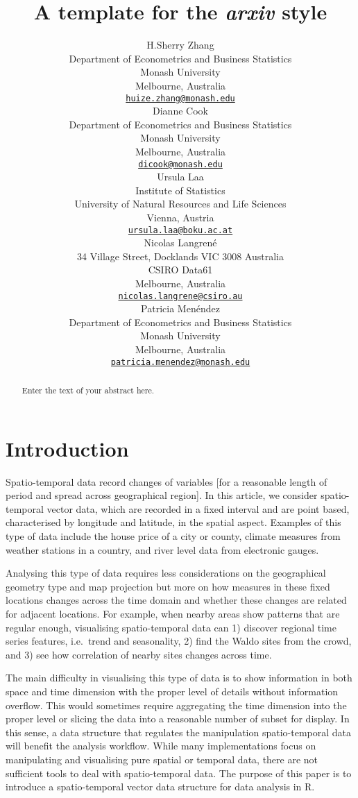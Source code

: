 \documentclass{article}
\title{A template for the \emph{arxiv} style}
\author{
    H.Sherry Zhang
   \\
    Department of Econometrics and Business Statistics \\
    Monash University \\
  Melbourne, Australia \\
  \texttt{\href{mailto:huize.zhang@monash.edu}{\nolinkurl{huize.zhang@monash.edu}}} \\
   \And
    Dianne Cook
   \\
    Department of Econometrics and Business Statistics \\
    Monash University \\
  Melbourne, Australia \\
  \texttt{\href{mailto:dicook@monash.edu}{\nolinkurl{dicook@monash.edu}}} \\
   \And
    Ursula Laa
   \\
    Institute of Statistics \\
    University of Natural Resources and Life Sciences \\
  Vienna, Austria \\
  \texttt{\href{mailto:ursula.laa@boku.ac.at}{\nolinkurl{ursula.laa@boku.ac.at}}} \\
   \And
    Nicolas Langrené
   \\
    34 Village Street, Docklands VIC 3008 Australia \\
    CSIRO Data61 \\
  Melbourne, Australia \\
  \texttt{\href{mailto:nicolas.langrene@csiro.au}{\nolinkurl{nicolas.langrene@csiro.au}}} \\
   \And
    Patricia Menéndez
   \\
    Department of Econometrics and Business Statistics \\
    Monash University \\
  Melbourne, Australia \\
  \texttt{\href{mailto:patricia.menendez@monash.edu}{\nolinkurl{patricia.menendez@monash.edu}}} \\
  }
\begin{document}
\maketitle

\def\tightlist{}


\begin{abstract}
Enter the text of your abstract here.
\end{abstract}


\hypertarget{introduction}{%
\section{Introduction}\label{introduction}}

Spatio-temporal data record changes of variables {[}for a reasonable
length of period and spread across geographical region{]}. In this
article, we consider spatio-temporal vector data, which are recorded in
a fixed interval and are point based, characterised by longitude and
latitude, in the spatial aspect. Examples of this type of data include
the house price of a city or county, climate measures from weather
stations in a country, and river level data from electronic gauges.

Analysing this type of data requires less considerations on the
geographical geometry type and map projection but more on how measures
in these fixed locations changes across the time domain and whether
these changes are related for adjacent locations. For example, when
nearby areas show patterns that are regular enough, visualising
spatio-temporal data can 1) discover regional time series features,
i.e.~trend and seasonality, 2) find the Waldo sites from the crowd, and
3) see how correlation of nearby sites changes across time.

The main difficulty in visualising this type of data is to show
information in both space and time dimension with the proper level of
details without information overflow. This would sometimes require
aggregating the time dimension into the proper level or slicing the data
into a reasonable number of subset for display. In this sense, a data
structure that regulates the manipulation spatio-temporal data will
benefit the analysis workflow. While many implementations focus on
manipulating and visualising pure spatial or temporal data, there are
not sufficient tools to deal with spatio-temporal data. The purpose of
this paper is to introduce a spatio-temporal vector data structure for
data analysis in R.
\end{document}
